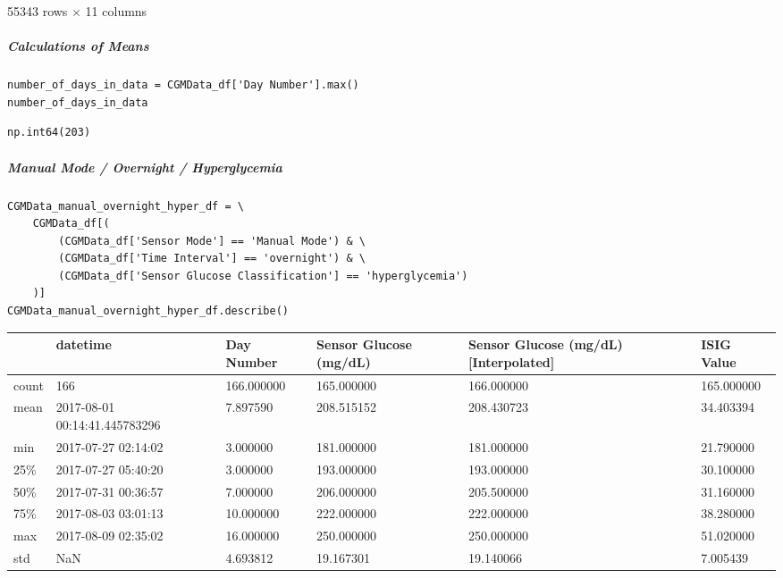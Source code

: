 \bigskip

55343 rows $\times$ 11 columns

\subparagraph{Calculations of Means}

\begin{verbatim}
number_of_days_in_data = CGMData_df['Day Number'].max()
number_of_days_in_data
\end{verbatim}

\begin{verbatim}
np.int64(203)
\end{verbatim}

\subparagraph{Manual Mode / Overnight / Hyperglycemia}

\begin{verbatim}
CGMData_manual_overnight_hyper_df = \
    CGMData_df[(
        (CGMData_df['Sensor Mode'] == 'Manual Mode') & \
        (CGMData_df['Time Interval'] == 'overnight') & \
        (CGMData_df['Sensor Glucose Classification'] == 'hyperglycemia')
    )]
CGMData_manual_overnight_hyper_df.describe()
\end{verbatim}

\bigskip\noindent
\begin{tabular}{p{}p{}p{}p{}p{}p{}}
\toprule
 & datetime & Day Number & Sensor Glucose (mg/dL) & Sensor Glucose (mg/dL) [Interpolated] & ISIG Value \\
\hline
count & 166 & 166.000000 & 165.000000 & 166.000000 & 165.000000 \\
\hline
mean & 2017-08-01 00:14:41.445783296 & 7.897590 & 208.515152 & 208.430723 & 34.403394 \\
\hline
min & 2017-07-27 02:14:02 & 3.000000 & 181.000000 & 181.000000 & 21.790000 \\
\hline
25\% & 2017-07-27 05:40:20 & 3.000000 & 193.000000 & 193.000000 & 30.100000 \\
\hline
50\% & 2017-07-31 00:36:57 & 7.000000 & 206.000000 & 205.500000 & 31.160000 \\
\hline
75\% & 2017-08-03 03:01:13 & 10.000000 & 222.000000 & 222.000000 & 38.280000 \\
\hline
max & 2017-08-09 02:35:02 & 16.000000 & 250.000000 & 250.000000 & 51.020000 \\
\hline
std & NaN & 4.693812 & 19.167301 & 19.140066 & 7.005439 \\
\hline
\bottomrule
\end{tabular}

